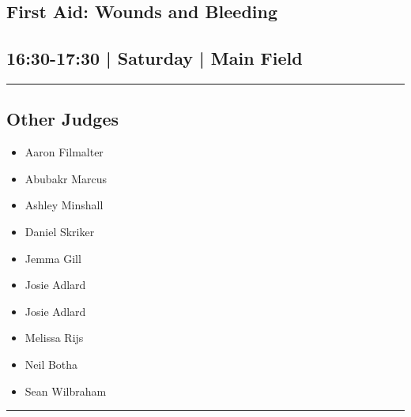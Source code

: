 \documentclass[10pt, A5]{article}
\begin{document}
        \begin{framed}
        \begin{minipage}{\textwidth}

        \setcounter{section}{29}
        \section{First Aid: Wounds and Bleeding}
        \subsection*{16:30-17:30 | Saturday | Main Field}

        \vspace{0.25cm}
        \hrule
        \vspace{0.25cm}


        \subsection*{Other Judges}
                    

        	\begin{multicols}{2}

		\begin{itemize}
									\item Aaron Filmalter
									\item Abubakr Marcus
									\item Ashley Minshall
									\item Daniel Skriker
									\item Jemma Gill
									\item Josie Adlard
						\end{itemize}

		\vfill\null
		\columnbreak

		\begin{itemize}
									\item Josie Adlard
									\item Melissa Rijs
									\item Neil Botha
									\item Sean Wilbraham
						\end{itemize}

		\vfill\null

		\end{multicols}

    \vspace{0.25cm}
        \hrule
        \vspace{0.25cm}


\end{minipage}
\end{framed}
\end{document}
